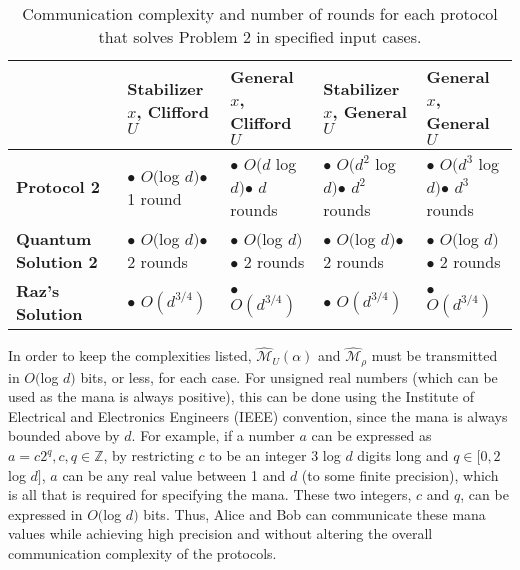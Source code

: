 \documentclass[../3Wworkreport.tex]{subfiles}
\begin{document}
\begin{table}[h]
\begin{center}
\begin{tabular}{p{} | p{} | p{} | p{} | p{}}
	& {\bfseries Stabilizer $x$, Clifford $U$}
		& \textbf{General $x$, Clifford $U$}
		& \textbf{Stabilizer $x$, General $U$}
		& \textbf{General $x$, General $U$}\\\hline
	\textbf{Protocol 2}
		& $\bullet$ $O($log $d)$\newline $\bullet$ 1 round
		& $\bullet$ $O(d$ log $d)$\newline $\bullet$ $d$ rounds
		& $\bullet$ $O(d^2$ log $d)$\newline $\bullet$ $d^2$ rounds
		& $\bullet$ $O(d^3$ log $d)$\newline $\bullet$ $d^3$ rounds \\\hline
	\textbf{Quantum\,\,\,\, Solution 2}
		& $\bullet$ $O($log $d)$\newline $\bullet$ 2 rounds
		& $\bullet$ $O($log $d)$\newline $\bullet$ 2 rounds
		& $\bullet$ $O($log $d)$\newline $\bullet$ 2 rounds
		& $\bullet$ $O($log $d)$\newline $\bullet$ 2 rounds \\\hline
	\textbf{Raz's Solution}
		& $\bullet$ $O(d^{3/4})$
		& $\bullet$ $O(d^{3/4})$
		& $\bullet$ $O(d^{3/4})$
		& $\bullet$ $O(d^{3/4})$ \\\hline
\end{tabular}
\end{center}
	\caption[Communication complexity of protocols for Problem 2.]{Communication complexity and number of rounds for each protocol that solves Problem 2 in specified input cases.}
	\label{tab:protocol_complex2}
\end{table}

In order to keep the complexities listed, $\hat{\mathcal{M}}_U(\alpha)$ and $\hat{\mathcal{M}}_\rho$ must be transmitted in $O($log $d)$ bits, or less, for each case. For unsigned real numbers (which can be used as the mana is always positive), this can be done using the Institute of Electrical and Electronics Engineers (IEEE) convention, since the mana is always bounded above by $d$. For example, if a number $a$ can be expressed as $a = c2^q, c,q \in \mathbb{Z}$, by restricting $c$ to be an integer 3 log $d$ digits long and $q \in [0, 2$ log $d]$, $a$ can be any real value between 1 and $d$ (to some finite precision), which is all that is required for specifying the mana. These two integers, $c$ and $q$, can be expressed in $O($log $d)$ bits. Thus, Alice and Bob can communicate these mana values while achieving high precision and without altering the overall communication complexity of the protocols.
\end{document}
